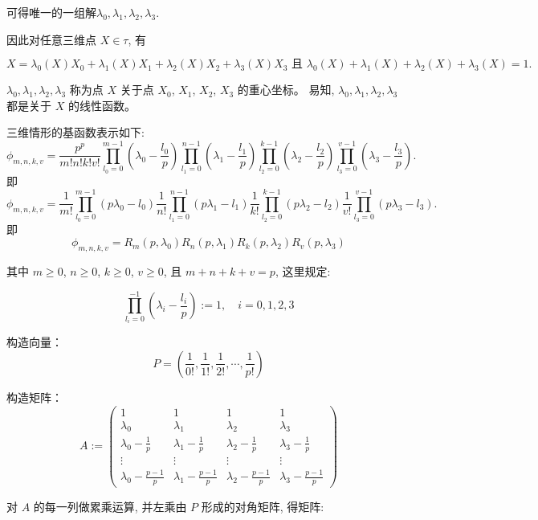 \documentclass[12pt,a4paper]{article}
\begin{document}
可得唯一的一组解$\lambda_0,\lambda_1,\lambda_2, \lambda_3$. 

因此对任意三维点 $X\in\tau$, 有

$$
X=\lambda_0(X)X_0 + \lambda_1(X)X_1 + \lambda_2(X)X_2 + \lambda_3(X)X_3 
\text{ 且 } \lambda_0(X) + \lambda_1(X) + \lambda_2(X) + \lambda_3(X) = 1. 
$$

$\lambda_0,\lambda_1,\lambda_2, \lambda_3$ 称为点 $X$ 关于点 $X_0$, $X_1$, $X_2$, $X_3$ 的重心坐标。
易知, $\lambda_0, \lambda_1, \lambda_2, \lambda_3$ 都是关于 $X$ 的线性函数。

三维情形的基函数表示如下:
$$
\phi_{m,n,k,v} = \frac{p^p}{m!n!k!v!}\prod_{l_0 = 0}^{m - 1}
(\lambda_0 - \frac{l_0}{p}) \prod_{l_1 = 0}^{n-1}(\lambda_1 -
\frac{l_1}{p}) \prod_{l_2=0}^{k-1}(\lambda_2 - \frac{l_2}{p})\prod_{l_3=0}^{v-1}(\lambda_3 - \frac{l_3}{p}).
$$
即
$$
\phi_{m,n,k,v} = \frac{1}{m!}\prod_{l_0 = 0}^{m - 1}
(p\lambda_0 -l_0)\frac{1}{n!}\prod_{l_1 = 0}^{n-1}(p\lambda_1 -
l_1)\frac{1}{k!}\prod_{l_2=0}^{k-1}(p\lambda_2 -l_2)\frac{1}{v!}\prod_{l_3=0}^{v-1}(p\lambda_3 - l_3).
$$
即
$$
\phi_{m,n,k,v} =R_m (p,\lambda_0)R_n (p,\lambda_1)R_k (p,\lambda_2)R_v (p,\lambda_3)
$$



其中 $ m\geq 0$, $n\geq 0$, $ k \geq 0$, $v\geq 0$,  且 $m+n+k+v=p$, 这里规定:

$$
 \prod_{l_i=0}^{-1}(\lambda_i - \frac{l_i}{p}) := 1,\quad i=0, 1, 2, 3
$$

构造向量：
$$
P = ( \frac{1}{0!},  \frac{1}{1!}, \frac{1}{2!}, \cdots, \frac{1}{p!})
$$

构造矩阵：
$$
A :=                                                                            
\begin{pmatrix}  
1  &  1  & 1 & 1\\
\lambda_0 & \lambda_1 & \lambda_2 & \lambda_3\\                                             
\lambda_0 - \frac{1}{p} & \lambda_1 - \frac{1}{p} & \lambda_2 - \frac{1}{p} & \lambda_3 - \frac{1}{p}\\   
\vdots & \vdots & \vdots & \vdots \\                                                     
\lambda_0 - \frac{p - 1}{p} & \lambda_1 - \frac{p - 1}{p} & \lambda_2 - \frac{p - 1}{p}& \lambda_3 - \frac{p - 1}{p}
\end{pmatrix}                                                                   
$$ 

对 $A$ 的每一列做累乘运算, 并左乘由 $P$ 形成的对角矩阵, 得矩阵:
\end{document}
